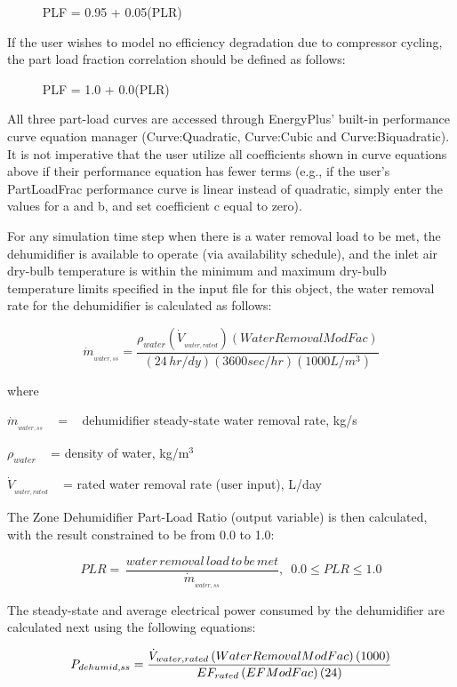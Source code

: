 ~~~~~ PLF = 0.95 + 0.05(PLR)

If the user wishes to model no efficiency degradation due to compressor cycling, the part load fraction correlation should be defined as follows:

~~~~~ PLF = 1.0 + 0.0(PLR)

All three part-load curves are accessed through EnergyPlus' built-in performance curve equation manager (Curve:Quadratic, Curve:Cubic and Curve:Biquadratic). It is not imperative that the user utilize all coefficients shown in curve equations above if their performance equation has fewer terms (e.g., if the user's PartLoadFrac performance curve is linear instead of quadratic, simply enter the values for a and b, and set coefficient c equal to zero).

For any simulation time step when there is a water removal load to be met, the dehumidifier is available to operate (via availability schedule), and the inlet air dry-bulb temperature is within the minimum and maximum dry-bulb temperature limits specified in the input file for this object, the water removal rate for the dehumidifier is calculated as follows:

\begin{equation}
{\dot m_{_{water,ss}}} = \frac{{{\rho_{water}}\left( {{{\dot V}_{_{water,rated}}}} \right)\left( {WaterRemovalModFac} \right)}}{{\left( {24\,hr/dy} \right)\left( {3600sec/hr} \right)\left( {1000L/{m^3}} \right)}}
\end{equation}

where

\({\dot m_{_{water,ss}}}\) ~ = ~ dehumidifier steady-state water removal rate, kg/s

\({\rho_{water}}\) ~ = density of water, kg/m\(^{3}\)

\({\dot V_{_{water,rated}}}\) ~ = rated water removal rate (user input), L/day

The Zone Dehumidifier Part-Load Ratio (output variable) is then calculated, with the result constrained to be from 0.0 to 1.0:

\begin{equation}
PLR = \,\frac{{water\,removal\,load\,to\,be\,met}}{{{{\dot m}_{_{water,ss}}}}},\,\,\,0.0 \le PLR \le 1.0
\end{equation}

The steady-state and average electrical power consumed by the dehumidifier are calculated next using the following equations:

\begin{equation}
  P_{dehumid,ss} = \frac{\dot{V}_{water,rated}\PB{WaterRemovalModFac}\PB{1000}}{EF_{rated}\PB{EFModFac}\PB{24}}
\end{equation}

